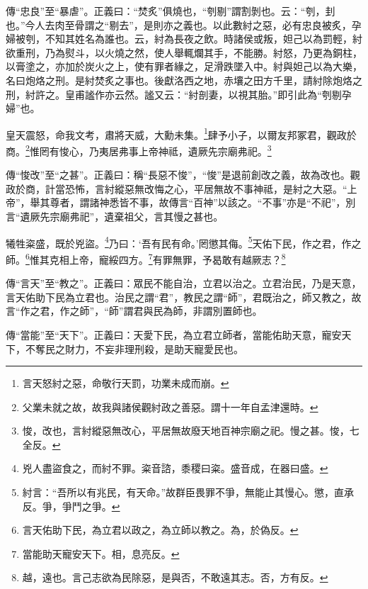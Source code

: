 {\noindent\zhuan{}\fzbyks 傳“忠良”至“暴虐”。正義曰：“焚炙”俱燒也，“刳剔”謂割剝也。云：“刳，刲也。”今人去肉至骨謂之“剔去”，是則亦之義也。以此數紂之惡，必有忠良被炙，孕婦被刳，不知其姓名為誰也。云，紂為長夜之飲。時諸侯或叛，妲己以為罰輕，紂欲重刑，乃為熨斗，以火燒之然，使人舉輒爛其手，不能勝。紂怒，乃更為銅柱，以膏塗之，亦加於炭火之上，使有罪者緣之，足滑跌墜入中。紂與妲己以為大樂，名曰炮烙之刑。是紂焚炙之事也。後獻洛西之地，赤壤之田方千里，請紂除炮烙之刑，紂許之。皇甫謐作亦云然。謐又云：“紂剖妻，以視其胎。”即引此為“刳剔孕婦”也。 \par}

皇天震怒，命我文考，肅將天威，大勳未集。\footnote{言天怒紂之惡，命敬行天罰，功業未成而崩。}肆予小子，以爾友邦冢君，觀政於商。\footnote{父業未就之故，故我與諸侯觀紂政之善惡。謂十一年自孟津還時。}惟罔有悛心，乃夷居弗事上帝神祗，遺厥先宗廟弗祀。\footnote{悛，改也，言紂縱惡無改心，平居無故廢天地百神宗廟之祀。慢之甚。悛，七全反。}

{\noindent\zhuan{}\fzbyks 傳“悛改”至“之甚”。正義曰：稱“長惡不悛”，“悛”是退前創改之義，故為改也。觀政於商，計當恐怖，言紂縱惡無改悔之心，平居無故不事神祗，是紂之大惡。“上帝”，舉其尊者，謂諸神悉皆不事，故傳言“百神”以該之。“不事”亦是“不祀”，別言“遺厥先宗廟弗祀”，遺棄祖父，言其慢之甚也。 \par}

犧牲粢盛，既於兇盜。\footnote{兇人盡盜食之，而紂不罪。粢音諮，黍稷曰粢。盛音成，在器曰盛。}乃曰：‘吾有民有命。’罔懲其侮。\footnote{紂言：“吾所以有兆民，有天命。”故群臣畏罪不爭，無能止其慢心。懲，直承反。爭，爭鬥之爭。}天佑下民，作之君，作之師。\footnote{言天佑助下民，為立君以政之，為立師以教之。為，於偽反。}惟其克相上帝，寵綏四方。\footnote{當能助天寵安天下。相，息亮反。}有罪無罪，予曷敢有越厥志？\footnote{越，遠也。言己志欲為民除惡，是與否，不敢遠其志。否，方有反。}

{\noindent\zhuan{}\fzbyks 傳“言天”至“教之”。正義曰：眾民不能自治，立君以治之。立君治民，乃是天意，言天佑助下民為立君也。治民之謂“君”，教民之謂“師”，君既治之，師又教之，故言“作之君，作之師”，“師”謂君與民為師，非謂別置師也。 \par}

{\noindent\zhuan{}\fzbyks 傳“當能”至“天下”。正義曰：天愛下民，為立君立師者，當能佑助天意，寵安天下，不奪民之財力，不妄非理刑殺，是助天寵愛民也。 \par}

